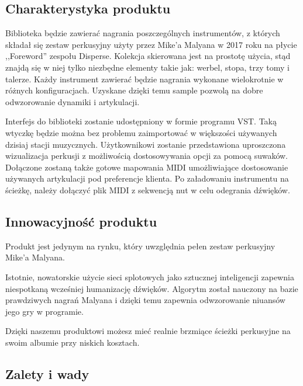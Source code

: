\documentclass[12pt]{article}
\begin{document}
\subsection{Charakterystyka produktu}


Biblioteka będzie zawierać nagrania poszczególnych instrumentów, z których składał się zestaw perkusyjny użyty przez Mike'a Malyana w 2017 roku na płycie ,,Foreword'' zespołu Disperse.
Kolekcja skierowana jest na prostotę użycia, stąd znajdą się w niej tylko niezbędne elementy takie jak: werbel, stopa, trzy tomy i talerze.
Każdy instrument zawierać będzie nagrania wykonane wielokrotnie w różnych konfiguracjach.
Uzyskane dzięki temu sample pozwolą na dobre odwzorowanie dynamiki i artykulacji.

Interfejs do biblioteki zostanie udostępniony w formie programu VST.
Taką wtyczkę będzie można bez problemu zaimportować w większości używanych dzisiaj stacji muzycznych.
Użytkownikowi zostanie przedstawiona uproszczona wizualizacja perkusji z możliwością dostosowywania opcji za pomocą suwaków.
Dołączone zostaną także gotowe mapowania MIDI umożliwiające dostosowanie używanych artykulacji pod preferencje klienta.
Po załadowaniu instrumentu na ścieżkę, należy dołączyć plik MIDI z sekwencją nut w celu odegrania dźwięków.

\subsection{Innowacyjność produktu}


Produkt jest jedynym na rynku, który uwzględnia pełen zestaw perkusyjny Mike'a Malyana.

Istotnie, nowatorskie użycie sieci splotowych jako sztucznej inteligencji zapewnia niespotkaną wcześniej humanizację dźwięków.
Algorytm został nauczony na bazie prawdziwych nagrań Malyana i dzięki temu zapewnia odwzorowanie niuansów jego gry w programie.

Dzięki naszemu produktowi możesz mieć realnie brzmiące ścieżki perkusyjne na swoim albumie przy niskich kosztach.

\subsection{Zalety i wady}
\end{document}
